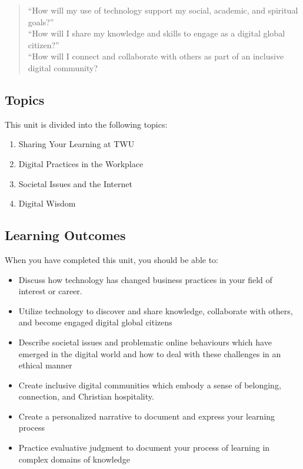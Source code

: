 \documentclass[
]{book}
\providecommand{\tightlist}{%
  \setlength{\itemsep}{0pt}\setlength{\parskip}{0pt}}
\theoremstyle{definition}
\theoremstyle{definition}
\theoremstyle{definition}
\theoremstyle{definition}
\theoremstyle{remark}
\begin{document}
\begin{quote}
``How will my use of technology support my social, academic, and spiritual goals?''\\
``How will I share my knowledge and skills to engage as a digital global citizen?''\\
``How will I connect and collaborate with others as part of an inclusive digital community?
\end{quote}

\hypertarget{topics-5}{%
\subsection*{Topics}\label{topics-5}}

This unit is divided into the following topics:

\begin{enumerate}
\def\labelenumi{\arabic{enumi}.}
\tightlist
\item
  Sharing Your Learning at TWU\\
\item
  Digital Practices in the Workplace\\
\item
  Societal Issues and the Internet\\
\item
  Digital Wisdom
\end{enumerate}

\hypertarget{learning-outcomes-5}{%
\subsection*{Learning Outcomes}\label{learning-outcomes-5}}

When you have completed this unit, you should be able to:

\begin{itemize}
\tightlist
\item
  Discuss how technology has changed business practices in your field of interest or career.\\
\item
  Utilize technology to discover and share knowledge, collaborate with others, and become engaged digital global citizens\\
\item
  Describe societal issues and problematic online behaviours which have emerged in the digital world and how to deal with these challenges in an ethical manner\\
\item
  Create inclusive digital communities which embody a sense of belonging, connection, and Christian hospitality.
\item
  Create a personalized narrative to document and express your learning process
\item
  Practice evaluative judgment to document your process of learning in complex domains of knowledge
\end{itemize}
\end{document}
